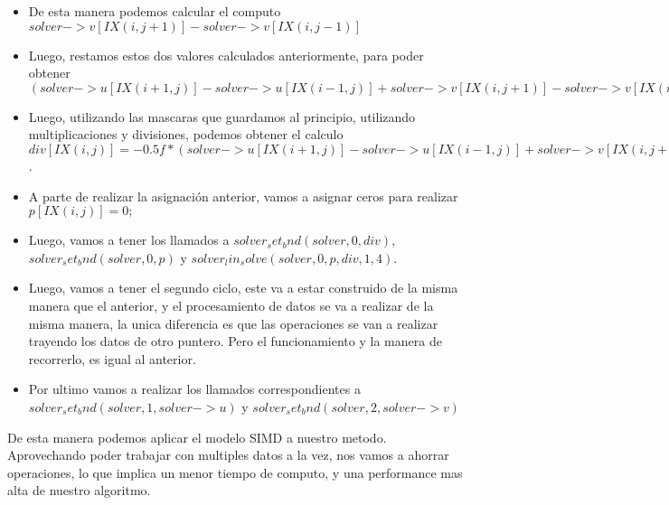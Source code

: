 \begin{itemize}
\item De esta manera podemos calcular el computo $solver->v[IX(i,j+1)] - solver->v[IX(i,j-1)]$
\item Luego, restamos estos dos valores calculados anteriormente, para poder obtener $(solver->u[IX(i+1,j)] - solver->u[IX(i-1,j)] + solver->v[IX(i,j+1)] - solver->v[IX(i,j-1)])$
\item Luego, utilizando las mascaras que guardamos al principio, utilizando multiplicaciones y divisiones, podemos obtener el calculo $div[IX(i,j)] = - 0.5f * (solver->u[IX(i+1,j)] - solver->u[IX(i-1,j)] + solver->v[IX(i,j+1)] - solver->v[IX(i,j-1)]) / solver->N$.
\item A parte de realizar la asignaci\'on anterior, vamos a asignar ceros para realizar $p[IX(i,j)] = 0;$
\item Luego, vamos a tener los llamados a $solver_set_bnd ( solver, 0, div )$, $solver_set_bnd ( solver, 0, p )$ y $solver_lin_solve ( solver, 0, p, div, 1, 4 )$.
\item Luego, vamos a tener el segundo ciclo, este va a estar construido de la misma manera que el anterior, y el procesamiento de datos se va a realizar de la misma manera, la unica diferencia es que las operaciones se van a realizar trayendo los datos de otro puntero. Pero el funcionamiento y la manera de recorrerlo, es igual al anterior.
\item Por ultimo vamos a realizar los llamados correspondientes a $solver_set_bnd ( solver, 1, solver->u )$ y $solver_set_bnd ( solver, 2, solver->v )$
\end{itemize}

De esta manera podemos aplicar el modelo SIMD a nuestro metodo. Aprovechando poder trabajar con multiples datos a la vez, nos vamos a ahorrar operaciones, lo que implica un menor tiempo de computo, y una performance mas alta de nuestro algoritmo.

 
